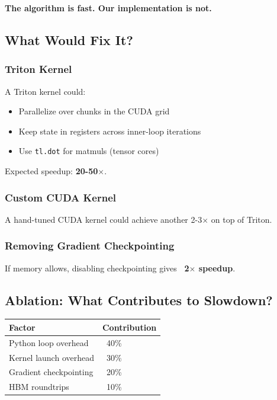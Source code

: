 \textbf{The algorithm is fast. Our implementation is not.}

\subsection{What Would Fix It?}

\subsubsection{Triton Kernel}

A Triton kernel could:
\begin{itemize}
\item Parallelize over chunks in the CUDA grid
\item Keep state in registers across inner-loop iterations
\item Use \texttt{tl.dot} for matmuls (tensor cores)

\end{itemize}
Expected speedup: \textbf{20-50$\times$}.

\subsubsection{Custom CUDA Kernel}

A hand-tuned CUDA kernel could achieve another 2-3$\times$ on top of Triton.

\subsubsection{Removing Gradient Checkpointing}

If memory allows, disabling checkpointing gives \textbf{~2$\times$ speedup}.

\subsection{Ablation: What Contributes to Slowdown?}

\begin{table}[H]
\centering
\small
\begin{tabular}{ll}
\toprule
\textbf{Factor} & \textbf{Contribution} \\
\midrule
Python loop overhead & ~40\% \\
Kernel launch overhead & ~30\% \\
Gradient checkpointing & ~20\% \\
HBM roundtrips & ~10\% \\
\bottomrule
\end{tabular}
\end{table}

